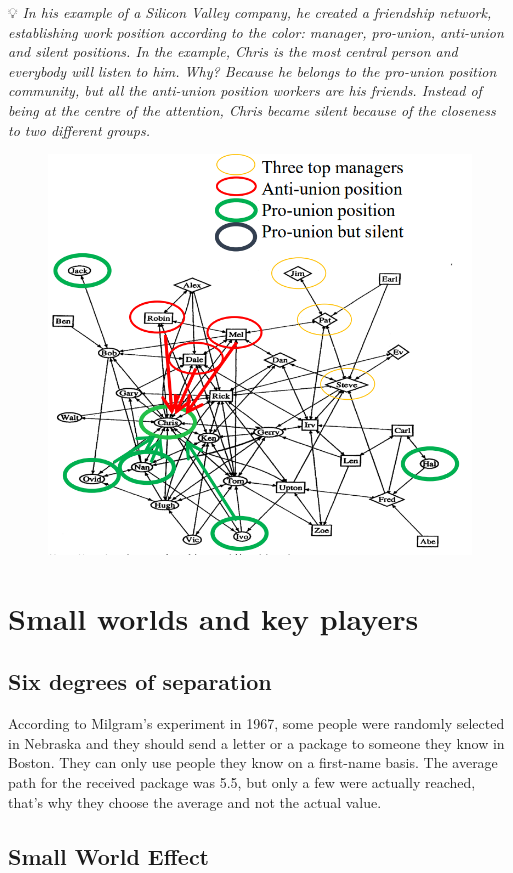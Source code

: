 \documentclass[
  notitlepage,
  onecolumn,
  openany]{book}
\begin{document}
💡 \emph{In his example of a Silicon Valley company, he created a friendship network, establishing work position according to the color: manager, pro-union, anti-union and silent positions. In the example, Chris is the most central person and everybody will listen to him. Why? Because he belongs to the pro-union position community, but all the anti-union position workers are his friends. Instead of being at the centre of the attention, Chris became silent because of the closeness to two different groups.}

\begin{figure}[h!]

{\centering \includegraphics[width=0.5\linewidth]{images/07-Triads and structural holes/Untitled 3} 

}

\end{figure}

\hypertarget{small-worlds-and-key-players}{%
\section{Small worlds and key players}\label{small-worlds-and-key-players}}

\hypertarget{six-degrees-of-separation}{%
\subsection{Six degrees of separation}\label{six-degrees-of-separation}}

According to Milgram's experiment in 1967, some people were randomly selected in Nebraska and they should send a letter or a package to someone they know in Boston. They can only use people they know on a first-name basis. The average path for the received package was 5.5, but only a few were actually reached, that's why they choose the average and not the actual value.

\hypertarget{small-world-effect}{%
\subsection{Small World Effect}\label{small-world-effect}}
\end{document}
